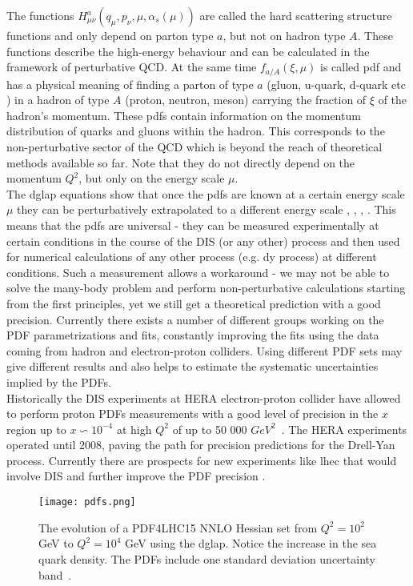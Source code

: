 		The functions $H^a_{\mu\nu}(q_{\mu},p_{\nu},\mu,\alpha_s(\mu))$ are called the hard scattering structure functions and only depend on parton type $a$, but not on hadron type $A$. These functions describe the high-energy behaviour and can be calculated in the framework of perturbative QCD. At the same time $f_{a/A}(\xi,\mu)$ is called \gls{pdf} and has a physical meaning of finding a parton of type $a$ (gluon, u-quark, d-quark etc ) in a hadron of type $A$ (proton, neutron, meson) carrying the fraction of $\xi$ of the hadron's momentum. These \gls{pdf}s contain information on the momentum distribution of quarks and gluons within the hadron. This corresponds to the non-perturbative sector of the QCD which is beyond the reach of theoretical methods available so far. Note that they do not directly depend on the momentum $Q^2$, but only on the energy scale $\mu$. \\
		The \gls{dglap} equations show that once the \gls{pdf}s are known at a certain energy scale $\mu$ they can be perturbatively extrapolated to a different energy scale \cite{Lipatov:1974qm}, \cite{ALTARELLI}, \cite{Gribov:1972ri}, \cite{Dokshitzer:1977sg}. This means that the \gls{pdf}s are universal - they can be measured experimentally at certain conditions in the course of the DIS (or any other) process and then used for numerical calculations of any other process (e.g. \gls{dy} process) at different conditions. Such a measurement allows a workaround - we may not be able to solve the many-body problem and perform non-perturbative calculations starting from the first principles, yet we still get a theoretical prediction with a good precision. Currently there exists a number of different groups working on the PDF parametrizations and fits, constantly improving the fits using the data coming from hadron and electron-proton colliders. Using different PDF sets may give different results and also helps to estimate the systematic uncertainties implied by the PDFs. \\
		Historically the DIS experiments at HERA electron-proton collider have allowed to perform proton PDFs measurements with a good level of precision in the $x$ region up to $x \backsim 10^{-4}$ at high $Q^2$ of up to 50 000 $GeV^2$~\cite{shushin}. The HERA experiments operated until 2008, paving the path for precision predictions for the Drell-Yan process.  Currently there are prospects for new experiments like \gls{lhec} that would involve DIS and further improve the PDF precision \cite{lhec}.
		\begin{figure}[htbp]
		\texttt{[image: pdfs.png]}
		\caption{The evolution of a PDF4LHC15 NNLO Hessian set from $Q^2=10^2$ GeV to $Q^2=10^4$ GeV using the \gls{dglap}. Notice the increase in the sea quark density. The PDFs include one standard deviation uncertainty band~\cite{proton_struct}.}
		\label{fig::pdfs}
		\end{figure}
